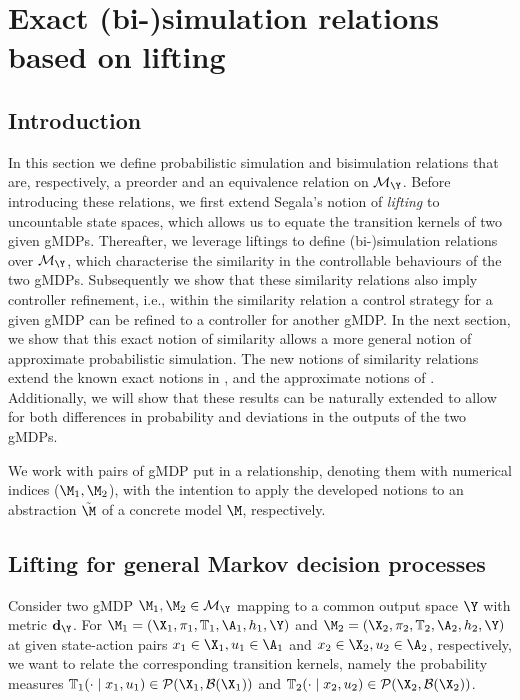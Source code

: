 \documentclass[letterpaper, 10 pt, conference]{amsart}
\theoremstyle{definition}
\theoremstyle{example}
\theoremstyle{remark}
\begin{document}
\section{Exact (bi-)simulation relations based on lifting}\label{sec:exact}
\subsection{Introduction}
In this section we define probabilistic simulation and bisimulation relations that are, respectively, a preorder and an equivalence relation on $\mathcal{M}_\Y$. 
Before introducing these relations, 
we first extend Segala's notion \cite{Segala1995,Segala1995a} of \emph{lifting} to uncountable state spaces, which allows us to equate the transition kernels of two given gMDPs.  
Thereafter, we leverage liftings to define (bi-)simulation relations over $\mathcal{M}_\Y$, which characterise the similarity in the controllable behaviours of the two gMDPs.  
Subsequently we show that these similarity relations also imply controller refinement, 
i.e., within the similarity relation a control strategy for a given gMDP can be refined to a controller for another gMDP. 
In the next section, we show that this exact notion of similarity allows a more general notion of approximate probabilistic simulation. 
The new notions of similarity relations extend the known exact notions in \cite{larsen1991bisimulation}, and the approximate notions of \cite{Desharnais2008,cDAK12}. 
Additionally,  we will show that these results can be naturally extended to allow for both differences in probability and deviations in the outputs of the two gMDPs. 


We work with pairs of gMDP put in a relationship, denoting them with numerical indices ($\M_1, \M_2$), 
with the intention to apply the developed notions to an abstraction $\tilde \M$ of a concrete model $\M$, 
respectively.  

\subsection{Lifting for general Markov decision processes}
 
Consider two gMDP $\M_1,\M_2\in \mathcal{M}_\Y$ mapping to a common output space $\Y$ with metric $\mathbf d_\Y$.
For $\M_1=(\X_1,\pi_1,\mathbb T_1,\A_1, h_1, \Y)$ and $\M_2=(\X_2,\pi_2,\mathbb T_2,\A_2, h_2, \Y)$ at given state-action pairs $x_1\in \X_1,u_1\in \A_1$ and $x_2\in \X_2,u_2\in \A_2$, respectively, 
we want to relate the corresponding transition kernels, 
namely the probability measures $\mathbb T_1(\cdot\mid x_1,u_1)\in\mathcal{P}(\X_1,\mathcal{B}(\X_1))$  and $\mathbb T_2(\cdot\mid x_2,u_2)\in\mathcal{P}(\X_2,\mathcal{B}(\X_2))$. 
\end{document}
